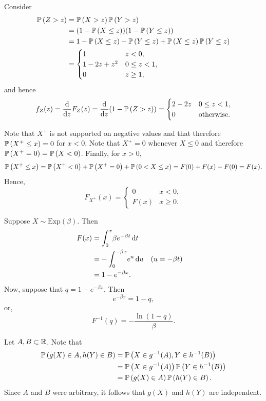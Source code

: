 \begin{ex}
  Consider
  \begin{align*}
    \P{Z>z}
     & =\P{X>z}\P{Y>z}                                       \\
     & =(1-\P{X \leq z})(1-\P{Y \leq z})                     \\
     & =1-\P{X \leq z}-\P{Y \leq z}+\P{X \leq z}\P{Y \leq z} \\
     & =\begin{cases}
      1        & z< 0,       \\
      1-2z+z^2 & 0\leq z< 1, \\
      0        & z\geq 1,
    \end{cases}
  \end{align*}
  and hence
  \[
    f_Z(z)
    =\frac{\d}{\d{z}} F_Z(z)
    =\frac{\d}{\d{z}} (1 - \P{Z>z})
    =\begin{cases}
      2-2z & 0\leq z< 1,       \\
      0    & \text{otherwise}.
    \end{cases}
  \]
\end{ex}

\begin{ex}
  Note that $X^+$ is not supported on negative values and that therefore
  $\P{X^+\leq x}=0$ for $x<0$. Note that $X^+=0$ whenever $X\leq 0$ and
  therefore $\P{X^+=0}=\P{X<0}$. Finally, for $x>0$,
  \[
    \P{X^+\leq x}
    =\P{X^+<0}+\P{X^+=0}+\P{0<X\leq x}
    =F(0)+F(x)-F(0)=F(x).
  \]
  Hence,
  \[
    F_{X^+}(x)=\begin{cases}
      0    & x < 0,    \\
      F(x) & x \geq 0.
    \end{cases}
  \]
\end{ex}

\begin{ex}
  Suppose $X\sim \text{Exp}(\beta)$. Then
  \begin{align*}
    F(x)
     & =\int_{0}^x\!\beta e^{-\beta t}\,\d{t}                   \\
     & =-\int_{0}^{-\beta x}\!e^{u}\,\d{u}    &  & (u=-\beta t) \\
     & =1-e^{-\beta x}.
  \end{align*}
  Now, suppose that $q=1-e^{-\beta x}$. Then
  \[
    e^{-\beta x}= 1 - q,
  \]
  or,
  \[
    F^{-1}(q) = -\frac{\ln(1 - q)}{\beta}.
  \]
\end{ex}

\begin{ex}
  Let $A,B\subset \R$. Note that
  \begin{align*}
    \P{g(X)\in A, h(Y)\in B}
     & =\P{X\in g^{-1}(A), Y\in h^{-1}(B)}   \\
     & =\P{X\in g^{-1}(A)}\P{Y\in h^{-1}(B)} \\
     & =\P{g(X)\in A}\P{h(Y)\in B}.
  \end{align*}
  Since $A$ and $B$ were arbitrary, it follows that $g(X)$ and $h(Y)$ are
  independent.
\end{ex}

